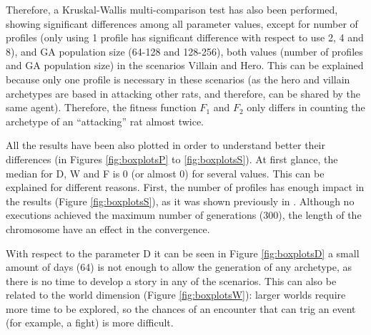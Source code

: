 \documentclass[runningheads,a4paper]{llncs}
\begin{document}
Therefore, a Kruskal-Wallis multi-comparison test has also been
performed, showing significant differences among all parameter values,
except for number of profiles (only using 1 profile has significant
difference with respect to use 2, 4 and 8), and GA population size
(64-128 and 128-256), both values (number of profiles and GA population size) in the scenarios Villain and Hero. This
can be explained because only one profile is necessary in these
scenarios (as the hero and villain archetypes are based in attacking
other rats, and therefore, can be shared by the same agent). Therefore, 
the fitness function $F_1$ and $F_2$ only differs in counting the archetype of an ``attacking'' rat almost twice.  %


All the results have been also plotted in order to understand better
their differences (in Figures \ref{fig:boxplotsP} to \ref{fig:boxplotsS}). At first glance, the median for D, W and F is 0 (or almost 0) for several
values. This can be explained for different reasons. First, the number of profiles has enough impact in the results (Figure \ref{fig:boxplotsS}), as it was shown previously in \cite{garcia14my}. Although no executions achieved the maximum number of generations (300), the length of the chromosome have an effect in the convergence. %

With respect to the parameter D it can be seen in Figure \ref{fig:boxplotsD} a small
amount of days (64) is not enough to allow the generation of any
archetype, as there is no time to develop a story in any of the scenarios. This can also be
related to the world dimension (Figure \ref{fig:boxplotsW}): larger worlds require more time to be
explored, so the chances of an encounter that can trig an event (for
example, a fight) is more difficult. 
\end{document}
